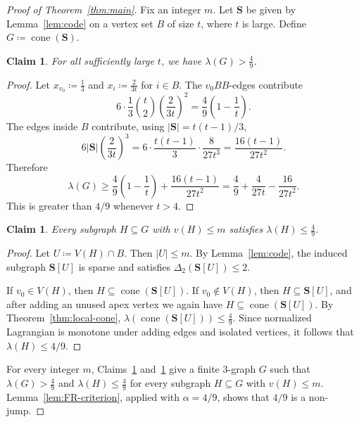 \documentclass[10pt]{article}
\numberwithin{equation}{section}
\newtheorem{claim}[theorem]{Claim}
\theoremstyle{definition}
\theoremstyle{remark}
\newcommand{\La}{\lambda}
\newcommand{\cone}{\operatorname{cone}}
\newcommand{\Sint}{\mathbf{S}}
\begin{document}
\begin{proof}[Proof of Theorem~\ref{thm:main}]
Fix an integer $m$. Let $\Sint$ be given by Lemma~\ref{lem:code} on a vertex set $B$ of size $t$, where $t$ is large. Define $G \coloneqq \cone(\Sint)$.

\begin{claim}\label{lem:global-lag}
For all sufficiently large $t$, we have $\La(G)>\frac49$.
\end{claim}

\begin{proof}
Let $x_{v_0} \coloneqq \frac13$ and $x_i \coloneqq \frac{2}{3t}$ for $i \in B$. The $v_0BB$-edges contribute
\[
        6\cdot\frac13\binom t2\left(\frac{2}{3t}\right)^2
        =\frac49\left(1-\frac1t\right).
\]
The edges inside $B$ contribute, using $|\Sint|=t(t-1)/3$,
\[
        6|\Sint|\left(\frac{2}{3t}\right)^3
        =6\cdot\frac{t(t-1)}3\cdot\frac{8}{27t^3}
        =\frac{16(t-1)}{27t^2}.
\]
Therefore
\[
        \La(G)
        \ge
        \frac49\left(1-\frac1t\right)+\frac{16(t-1)}{27t^2}
        =\frac49+\frac4{27t}-\frac{16}{27t^2}.
\]
This is greater than $4/9$ whenever $t>4$.
\end{proof}


\begin{claim}\label{lem:small-subgraphs}
Every subgraph $H\subseteq G$ with $v(H)\le m$ satisfies $\La(H)\le \frac49$.
\end{claim}

\begin{proof}
Let $U \coloneqq V(H)\cap B$. Then $|U|\le m$. By Lemma~\ref{lem:code}, the induced subgraph $\Sint[U]$ is sparse and satisfies $\Delta_2(\Sint[U])\le2$.

If $v_0\in V(H)$, then $H\subseteq \cone(\Sint[U])$. If $v_0\notin V(H)$, then $H\subseteq \Sint[U]$, and after adding an unused apex vertex we again have $H\subseteq \cone(\Sint[U])$. By Theorem~\ref{thm:local-cone}, $\La(\cone(\Sint[U]))\le\frac49$. Since normalized Lagrangian is monotone under adding edges and isolated vertices, it follows that $\La(H)\le4/9$.
\end{proof}


For every integer $m$, Claims~\ref{lem:global-lag} and~\ref{lem:small-subgraphs} give a finite $3$-graph $G$ such that $\La(G)>\frac49$ and $\La(H)\le\frac49$ for every subgraph $H\subseteq G$ with $v(H)\le m$. Lemma~\ref{lem:FR-criterion}, applied with $\alpha=4/9$, shows that $4/9$ is a non-jump.
\end{proof}
\end{document}
